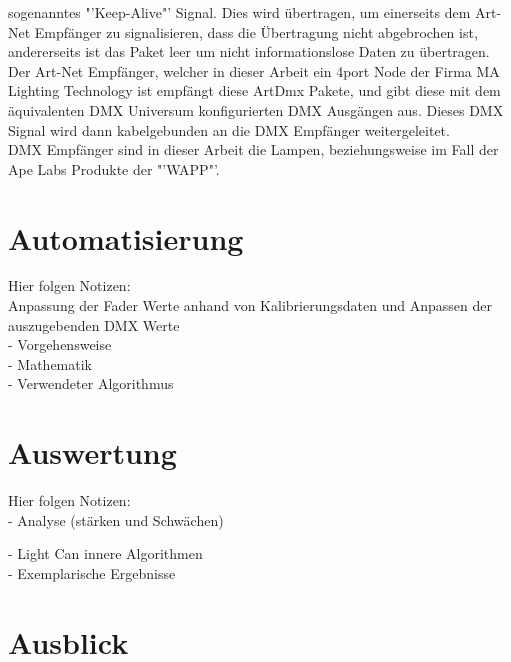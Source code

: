 \documentclass[11pt]{scrartcl}
\begin{document}
sogenanntes "'Keep-Alive"' Signal. Dies wird übertragen, um einerseits dem Art-Net Empfänger zu signalisieren, dass die Übertragung nicht abgebrochen ist,
andererseits ist das Paket leer um nicht informationslose Daten zu übertragen.\\
Der Art-Net Empfänger, welcher in dieser Arbeit ein 4port Node der Firma MA Lighting Technology ist empfängt diese ArtDmx Pakete, und gibt diese mit dem äquivalenten
DMX Universum konfigurierten DMX Ausgängen aus. Dieses DMX Signal wird dann kabelgebunden an die DMX Empfänger weitergeleitet.\\
DMX Empfänger sind in dieser Arbeit die Lampen, beziehungsweise im Fall der Ape Labs Produkte der "'WAPP"'.
\clearpage

\section{Automatisierung}
{\color{red}
Hier folgen Notizen:\\
Anpassung der Fader Werte anhand von Kalibrierungsdaten und Anpassen der auszugebenden DMX Werte\\
 - Vorgehensweise\\
 - Mathematik\\
 - Verwendeter Algorithmus}
\clearpage

\section{Auswertung}
{\color{red}
Hier folgen Notizen:\\
- Analyse (stärken und Schwächen)
\begin{addmargin}[2em]{0em}
   - Light Can innere Algorithmen\\
   - Exemplarische Ergebnisse
\end{addmargin}}
\clearpage

\section{Ausblick}
\clearpage

\renewcommand{\thesubsection}{\Alph{subsection}}
\end{document}
